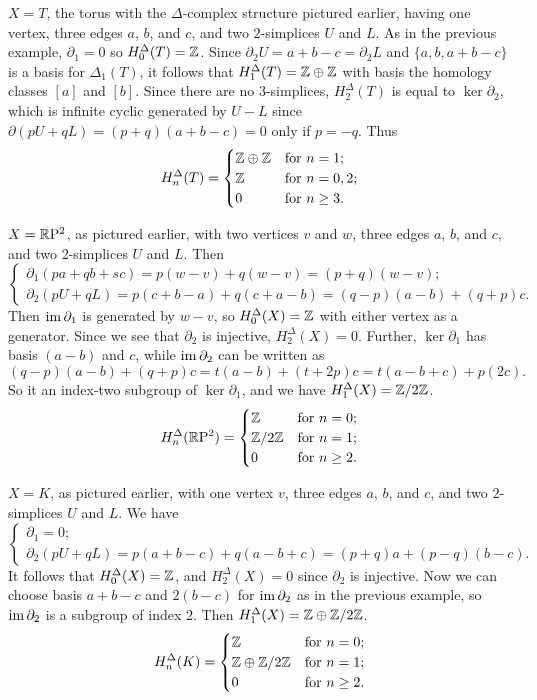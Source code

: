 \begin{example}
$X=T$, the torus with the $\Delta$-complex structure pictured earlier, having one vertex, three edges $a$, $b$, and $c$, and two $2$-simplices $U$ and $L$. As in the previous example, $\partial_1=0$ so $H^\Delta_0(T)=\mathbb{Z}$. Since $\partial_2U=a+b-c=\partial_2L$ and $\{a,b,a+b-c\}$ is a basis for $\Delta_1(T)$, it follows that $H^\Delta_1(T)=\mathbb{Z}\oplus\mathbb{Z}$ with basis the homology classes $[a]$ and $[b]$. Since there are no $3$-simplices, $H^\Delta_2(T)$ is equal to $\ker\partial_2$, which is infinite cyclic generated by $U-L$ since $\partial(pU+qL)=(p+q)(a+b-c)=0$ only if $p=-q$. Thus
\[H_n^\Delta(T)=\begin{cases}
\mathbb{Z}\oplus\mathbb{Z}&\text{for }n=1;\\
\mathbb{Z}&\text{for }n=0,2;\\
0&\text{for }n\geq 3.
\end{cases}\]
\end{example}
\begin{example}
$X=\mathbb{R}\mathrm{P}^2$, as pictured earlier, with two vertices $v$ and $w$, three edges $a$, $b$, and $c$, and two $2$-simplices $U$ and $L$. Then 
\[\left\{\begin{array}{l}
\partial_1(pa+qb+sc)=p(w-v)+q(w-v)=(p+q)(w-v);\\
\partial_2(pU+qL)=p(c+b-a)+q(c+a-b)=(q-p)(a-b)+(q+p)c.
\end{array}\right. \]
Then $\mathrm{im}\,\partial_1$ is generated by $w-v$, so $H^\Delta_0(X)=\mathbb{Z}$ with either vertex as a generator. Since we see that $\partial_2$ is injective, $H^\Delta_2(X)=0$. Further, $\ker\partial_1$ has basis $(a-b)$ and $c$, while $\mathrm{im}\,\partial_2$ can be written as
\[(q-p)(a-b)+(q+p)c=t(a-b)+(t+2p)c=t(a-b+c)+p(2c).\]
So it an index-two subgroup of $\ker\partial_1$, and we have $H^\Delta_1(X)=\mathbb{Z}/2\mathbb{Z}$.
\[H_n^\Delta(\mathbb{R}\mathrm{P}^2)=\begin{cases}
\mathbb{Z}&\text{for }n=0;\\
\mathbb{Z}/2\mathbb{Z}&\text{for }n=1;\\
0&\text{for }n\geq 2.
\end{cases}\]
\end{example}
\begin{example}
$X=K$, as pictured earlier, with one vertex $v$, three edges $a$, $b$, and $c$, and two $2$-simplices $U$ and $L$. We have
\[\left\{\begin{array}{l}
\partial_1=0;\\
\partial_2(pU+qL)=p(a+b-c)+q(a-b+c)=(p+q)a+(p-q)(b-c).
\end{array}\right. \]
It follows that $H_0^\Delta(X)=\mathbb{Z}$, and $H^\Delta_2(X)=0$ since $\partial_2$ is injective. Now we can choose basis $a+b-c$ and $2(b-c)$ for $\mathrm{im}\,\partial_2$ as in the previous example, so $\mathrm{im}\,\partial_2$ is a subgroup of index $2$. Then $H^\Delta_1(X)=\mathbb{Z}\oplus\mathbb{Z}/2\mathbb{Z}$. 
\[H_n^\Delta(K)=\begin{cases}
\mathbb{Z}&\text{for }n=0;\\
\mathbb{Z}\oplus\mathbb{Z}/2\mathbb{Z}&\text{for }n=1;\\
0&\text{for }n\geq 2.
\end{cases}\]
\end{example}
